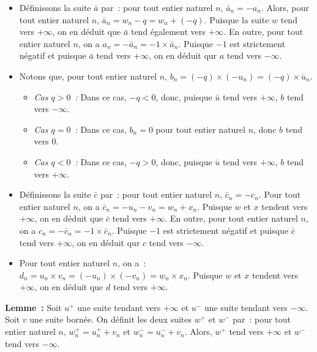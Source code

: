     \begin{itemize}[nosep]
        \item Définissons la suite $\bar{a}$ par : pour tout entier naturel $n$, $\bar{a}_n = - a_n$.
            Alors, pour tout entier naturel $n$, $\bar{a}_n = w_n - q = w_n + (-q)$.
            Puisque la suite $w$ tend vers $+\infty$, on en déduit que $\bar{a}$ tend également vers $+\infty$.
            En outre, pour tout entier naturel $n$, on a $a_n = - \bar{a}_n = -1 \times \bar{a}_n$.
            Puisque $-1$ est strictement négatif et puisque $\bar{a}$ tend vers $+\infty$, on en déduit qur $a$ tend vers $-\infty$.
        \item Notons que, pour tout entier naturel $n$, $b_n = (-q) \times (-u_n) = (-q) \times \bar{u}_n$. 
            \begin{itemize}[nosep]
                \item \emph{Cas $q > 0$ :} Dans ce cas, $-q < 0$, donc, puisque $\bar{u}$ tend vers $+\infty$, $b$ tend vers $-\infty$.
                \item \emph{Cas $q = 0$ :} Dans ce cas, $b_n = 0$ pour tout entier naturel $n$, donc $b$ tend vers $0$.
                \item \emph{Cas $q < 0$ :} Dans ce cas, $-q > 0$, donc, puisque $\bar{u}$ tend vers $+\infty$, $b$ tend vers $+\infty$.
            \end{itemize}
        \item Définissons la suite $\bar{c}$ par : pour tout entier naturel $n$, $\bar{c}_n = - c_n$.
            Pour tout entier naturel $n$, on a $\bar{c}_n = -u_n - v_n = w_n + x_n$.
            Puisque $w$ et $x$ tendent vers $+\infty$, on en déduit que $\bar{c}$ tend vers $+\infty$.
            En outre, pour tout entier naturel $n$, on a $c_n = - \bar{c}_n = -1 \times \bar{c}_n$.
            Puisque $-1$ est strictement négatif et puisque $\bar{c}$ tend vers $+\infty$, on en déduit qur $c$ tend vers $-\infty$.
        \item Pour tout entier naturel $n$, on a : $d_n = u_n \times v_n = (- u_n) \times (- v_n) = w_n \times x_n$.
            Puisque $w$ et $x$ tendent vers $+\infty$, on en déduit que $d$ tend vers $+\infty$.
    \end{itemize}

    \done

\medskip

\noindent\textbf{Lemme :} Soit $u^+$ une suite tendant vers $+\infty$ et $u^-$ une suite tendant vers $-\infty$.
    Soit $v$ une suite bornée.
    On définit les deux suites $w^+$ et $w^-$ par : pour tout entier naturel $n$, $w^+_n = u^+_n + v_n$ et $w^-_n = u^ -_n + v_n$.
    Alors, $w^+$ tend vers $+\infty$ et $w^-$ tend vers $-\infty$.

